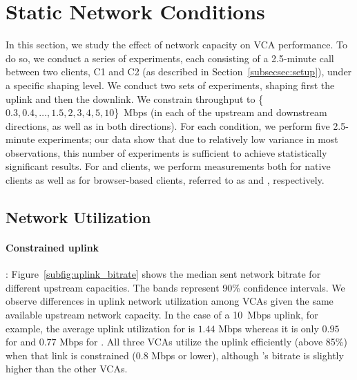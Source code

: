 \section{Static Network Conditions}\label{sec:static}

In this section, we study the effect of network capacity on VCA performance.
To do so, we conduct a series of experiments, each consisting of a 2.5-minute
call between two clients, C1 and C2 (as described in
Section~\ref{subsecsec:setup}), under a specific shaping level. We conduct two
sets of experiments, shaping first the uplink and then the downlink.  We
constrain throughput to \{$0.3, 0.4, \dots, 1.5, 2, 3, 4, 5, 10$\}~Mbps (in
each of the upstream and downstream directions, as well as in both
directions). For each condition, we perform five 2.5-minute experiments; our
data show that due to relatively low variance in most observations, this
number of experiments is sufficient to achieve statistically significant
results.  For \zoom and \teams clients, we perform measurements both for
native clients as well as for browser-based clients, referred
to as \zoombrowser and \teamsbrowser, respectively. 





\subsection{Network Utilization}
\label{subsec:network_utilization}

\paragraph{Constrained uplink}: Figure~\ref{subfig:uplink_bitrate} shows the
median sent network bitrate for different upstream capacities. The bands
represent 90\% confidence intervals. We observe differences in uplink network
utilization among VCAs given the same available upstream network capacity. In
the case of a 10~Mbps uplink, for example, the average uplink utilization for
\teamsnative is $1.44$ Mbps whereas it is only $0.95$ for \meet and $0.77$
Mbps for \zoom. All three VCAs utilize the uplink efficiently (above 85\%)
when that link is constrained (0.8 Mbps or lower), although \meet's
bitrate is slightly higher than the other VCAs.  

